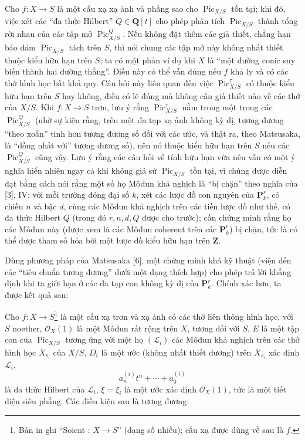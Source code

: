 Cho $f:X\longrightarrow S$ là một cấu xạ xạ ảnh và phẳng sao cho
$\operatorname{Pic}_{X/S}$ tồn tại; khi đó, việc xét các ``đa thức Hilbert''
$Q\in\mathbf Q[t]$ cho phép phân tích $\operatorname{Pic}_{X/S}$ thành tổng
rời nhau của các tập mở $\operatorname{Pic}_{X/S}^Q$. Nếu không đặt thêm các
giả thiết, chẳng hạn bảo đảm $\operatorname{Pic}_{X/S}$ tách trên $S$, thì
nói chung các tập mở này không nhất thiết thuộc kiểu hữu hạn trên $S$; ta có
một phản ví dụ khi $X$ là ``một đường conic suy biến thành hai đường thẳng''.
Điều này
có thể vẫn đúng nếu $f$ khả ly và có các thớ hình học bất khả quy. Câu hỏi này
liên quan đến việc $\operatorname{Pic}_{X/S}^\tau$ có thuộc kiểu hữu hạn trên
$S$ hay không, điều có lẽ đúng mà không cần giả thiết nào về các thớ của
$X/S$. Khi $f:X\longrightarrow S$ trơn, lưu ý rằng
$\operatorname{Pic}_{X/S}^\tau$ nằm trong một trong các
$\operatorname{Pic}_{X/S}^Q$ (nhờ sự kiện rằng, trên một đa tạp xạ ảnh không
kỳ dị, tương đương ``theo xoắn'' tinh hơn tương đương số đối với các ước, và
thật ra, theo Matsusaka, là ``đồng nhất với'' tương đương số), nên nó thuộc
kiểu hữu hạn trên $S$ nếu các $\operatorname{Pic}_{X/S}^Q$ cũng vậy. Lưu ý
rằng các câu hỏi về tính hữu hạn vừa nêu vẫn có một ý nghĩa hiển nhiên ngay cả khi
không giả sử $\operatorname{Pic}_{X/S}$ tồn tại, vì chúng được diễn đạt bằng
cách nói rằng một số họ Môđun khả nghịch là ``bị chặn'' theo nghĩa của [3],
IV: với mỗi trường đóng đại số $k$, xét các lược đồ con nguyên của
$\mathbf P_k^r$, có chiều $n$ và bậc $d$, cùng các Môđun khả nghịch trên các
tiền lược đồ như thế, có đa thức Hilbert $Q$ (trong đó $r,n,d,Q$ được cho
trước); cần chứng minh rằng họ các Môđun này (được xem là các Môđun coherent
trên các $\mathbf P_k^r$) bị chặn, tức là có thể được tham số hóa bởi một lược
đồ kiểu hữu hạn trên $\mathbf Z$.

Dùng phương pháp của Matsusaka [6], một chứng minh khá kỹ thuật (viện đến các
``tiêu chuẩn tương đương'' dưới một dạng thích hợp) cho phép trả lời khẳng định
khi ta giới hạn ở các đa tạp con không kỳ dị của $\mathbf P_k^r$. Chính xác
hơn, ta được kết quả sau:

 Cho $f:X\longrightarrow S$\footnote{Bản in ghi
``Soient : $X\longrightarrow S$'' (dạng số nhiều); cấu xạ được dùng về sau là
$f$.} là một cấu xạ trơn và xạ ảnh có các thớ liên thông hình học, với $S$
noether, $\mathcal O_X(1)$ là một Môđun rất rộng trên $X$, tương đối với $S$,
$E$ là một tập con của $\operatorname{Pic}_{X/S}$ tương ứng với một họ
$(\mathcal L_i)$ các Môđun khả nghịch trên các thớ hình học
$\overline X_{s_i}$ của $X/S$, $D_i$ là một ước (không nhất thiết dương) trên
$\overline X_{s_i}$ xác định $\mathcal L_i$,
\[
a_n^{(i)}t^n+\cdots+a_0^{(i)}
\]
là đa thức Hilbert của $\mathcal L_i$, $\xi=\xi_i$ là một ước xác định
$\mathcal O_X(1)$, tức là một tiết diện siêu phẳng. Các điều kiện sau là tương
đương:

